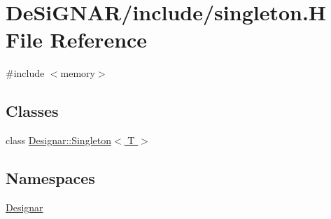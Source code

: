 \hypertarget{singleton_8_h}{}\section{De\+Si\+G\+N\+A\+R/include/singleton.H File Reference}
\label{singleton_8_h}
{\ttfamily \#include $<$memory$>$}\newline
\subsection*{Classes}
\begin{DoxyCompactItemize}
\item 
class \hyperlink{class_designar_1_1_singleton}{Designar\+::\+Singleton$<$ T $>$}
\end{DoxyCompactItemize}
\subsection*{Namespaces}
\begin{DoxyCompactItemize}
\item 
 \hyperlink{namespace_designar}{Designar}
\end{DoxyCompactItemize}
